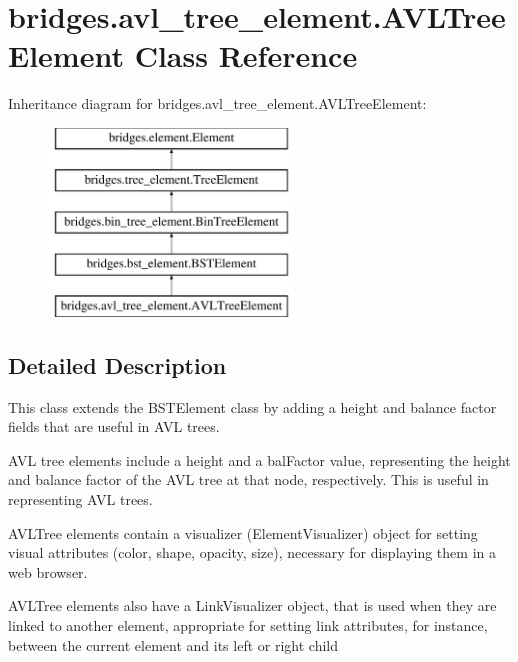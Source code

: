 \hypertarget{classbridges_1_1avl__tree__element_1_1_a_v_l_tree_element}{}\section{bridges.\+avl\+\_\+tree\+\_\+element.\+A\+V\+L\+Tree\+Element Class Reference}
\label{classbridges_1_1avl__tree__element_1_1_a_v_l_tree_element}
Inheritance diagram for bridges.\+avl\+\_\+tree\+\_\+element.\+A\+V\+L\+Tree\+Element\+:\begin{figure}[H]
\begin{center}
\leavevmode
\includegraphics[height=5.000000cm]{classbridges_1_1avl__tree__element_1_1_a_v_l_tree_element}
\end{center}
\end{figure}


\subsection{Detailed Description}
This class extends the B\+S\+T\+Element class by adding a height and balance factor fields that are useful in A\+VL trees. 

A\+VL tree elements include a \textquotesingle{}height\textquotesingle{} and a \textquotesingle{}bal\+Factor\textquotesingle{} value, representing the height and balance factor of the A\+VL tree at that node, respectively. This is useful in representing A\+VL trees.

A\+V\+L\+Tree elements contain a visualizer (Element\+Visualizer) object for setting visual attributes (color, shape, opacity, size), necessary for displaying them in a web browser.

A\+V\+L\+Tree elements also have a Link\+Visualizer object, that is used when they are linked to another element, appropriate for setting link attributes, for instance, between the current element and its left or right child

